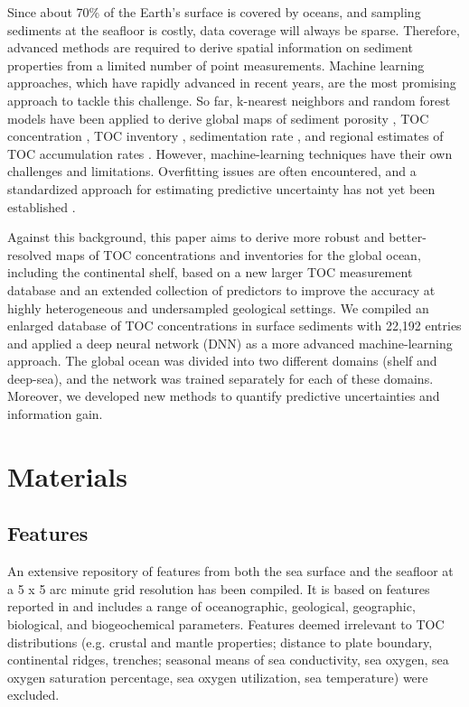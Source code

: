 \documentclass[journal abbreviation, manuscript]{copernicus}
\begin{document}
Since about 70\% of the Earth's surface is covered by oceans, and sampling sediments at the seafloor is costly, data coverage will always be sparse. Therefore, advanced methods are required to derive spatial information on sediment properties from a limited number of point measurements. Machine learning approaches, which have rapidly advanced in recent years, are the most promising approach to tackle this challenge. So far, k-nearest neighbors and random forest models have been applied to derive global maps of sediment porosity \citep{Martin2005Porosity}, TOC concentration \citep{LeeTOCkNN}, TOC inventory \citep{atwood2020}, sedimentation rate \citep{restrepo2, Restreppo2020}, and regional estimates of TOC accumulation rates \citep{diesing2021}. However, machine-learning techniques have their own challenges and limitations. Overfitting issues are often encountered, and a standardized approach for estimating predictive uncertainty has not yet been established \citep{LeeTOCkNN}.



Against this background, this paper aims to derive more robust and better-resolved maps of TOC concentrations and inventories for the global ocean, including the continental shelf, based on a new larger TOC measurement database and an extended collection of predictors to improve the accuracy at highly heterogeneous and undersampled geological settings. We compiled an enlarged database of TOC concentrations in surface sediments with 22,192 entries and applied a deep neural network (DNN) as a more advanced machine-learning approach. The global ocean was divided into two different domains (shelf and deep-sea), and the network was trained separately for each of these domains. Moreover, we developed new methods to quantify predictive uncertainties and information gain.



\section{Materials}
\subsection{Features}
\label{sec:features}
An extensive repository of features from both the sea surface and the seafloor at a 5 x 5 arc minute grid resolution has been compiled. It is based on features reported in \cite{LeeTOCkNN, restrepo2, HartDavis2021EOT20} and includes a range of oceanographic, geological, geographic, biological, and biogeochemical parameters. Features deemed irrelevant to TOC distributions (e.g. crustal and mantle properties; distance to plate boundary, continental ridges, trenches; seasonal means of sea conductivity, sea oxygen, sea oxygen saturation percentage, sea oxygen utilization, sea temperature) were excluded.
\end{document}
